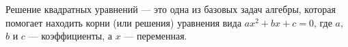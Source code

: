 \documentclass[preview]{standalone}
\begin{document}
\begin{center}
Решение квадратных уравнений — это одна из базовых задач алгебры, которая помогает находить корни (или решения) уравнения вида $ax^2 + bx + c = 0$, где $a$, $b$ и $c$ — коэффициенты, а $x$ — переменная.
\end{center}
\end{document}
